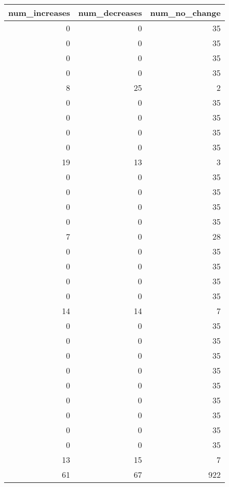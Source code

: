 \begin{tabular}{rrr}
\toprule
num_increases & num_decreases & num_no_change \\
\midrule
0 & 0 & 35 \\
0 & 0 & 35 \\
0 & 0 & 35 \\
0 & 0 & 35 \\
8 & 25 & 2 \\
0 & 0 & 35 \\
0 & 0 & 35 \\
0 & 0 & 35 \\
0 & 0 & 35 \\
19 & 13 & 3 \\
0 & 0 & 35 \\
0 & 0 & 35 \\
0 & 0 & 35 \\
0 & 0 & 35 \\
7 & 0 & 28 \\
0 & 0 & 35 \\
0 & 0 & 35 \\
0 & 0 & 35 \\
0 & 0 & 35 \\
14 & 14 & 7 \\
0 & 0 & 35 \\
0 & 0 & 35 \\
0 & 0 & 35 \\
0 & 0 & 35 \\
0 & 0 & 35 \\
0 & 0 & 35 \\
0 & 0 & 35 \\
0 & 0 & 35 \\
0 & 0 & 35 \\
13 & 15 & 7 \\
61 & 67 & 922 \\
\bottomrule
\end{tabular}
